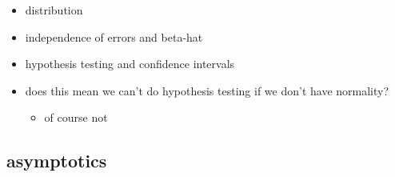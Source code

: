 \begin{itemize}
\item distribution
\item independence of errors and beta-hat
\item hypothesis testing and confidence intervals
\item does this mean we can't do hypothesis testing if we don't have
       normality?
\begin{itemize}
\item of course not
\end{itemize}
\end{itemize}

\subsection{asymptotics}

